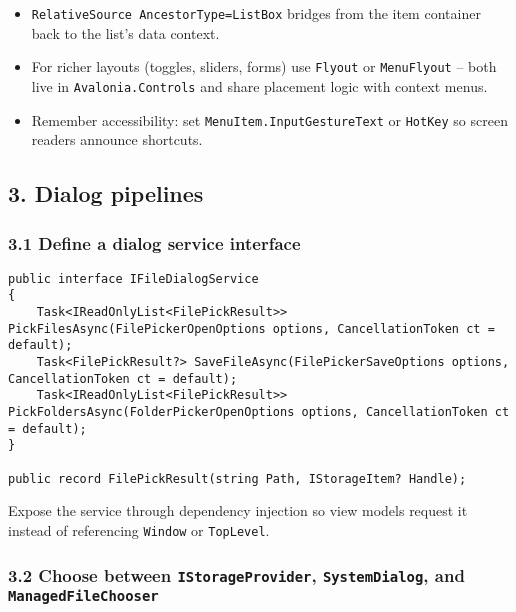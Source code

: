 \begin{itemize}
\tightlist
\item
  \passthrough{\lstinline!RelativeSource AncestorType=ListBox!} bridges
  from the item container back to the list's data context.
\item
  For richer layouts (toggles, sliders, forms) use
  \passthrough{\lstinline!Flyout!} or
  \passthrough{\lstinline!MenuFlyout!} -- both live in
  \passthrough{\lstinline!Avalonia.Controls!} and share placement logic
  with context menus.
\item
  Remember accessibility: set
  \passthrough{\lstinline!MenuItem.InputGestureText!} or
  \passthrough{\lstinline!HotKey!} so screen readers announce shortcuts.
\end{itemize}

\subsection{3. Dialog pipelines}\label{dialog-pipelines}

\subsubsection{3.1 Define a dialog service
interface}\label{define-a-dialog-service-interface}

\begin{lstlisting}
public interface IFileDialogService
{
    Task<IReadOnlyList<FilePickResult>> PickFilesAsync(FilePickerOpenOptions options, CancellationToken ct = default);
    Task<FilePickResult?> SaveFileAsync(FilePickerSaveOptions options, CancellationToken ct = default);
    Task<IReadOnlyList<FilePickResult>> PickFoldersAsync(FolderPickerOpenOptions options, CancellationToken ct = default);
}

public record FilePickResult(string Path, IStorageItem? Handle);
\end{lstlisting}

Expose the service through dependency injection so view models request
it instead of referencing \passthrough{\lstinline!Window!} or
\passthrough{\lstinline!TopLevel!}.

\subsubsection{\texorpdfstring{3.2 Choose between
\texttt{IStorageProvider}, \texttt{SystemDialog}, and
\texttt{ManagedFileChooser}}{3.2 Choose between IStorageProvider, SystemDialog, and ManagedFileChooser}}\label{choose-between-istorageprovider-systemdialog-and-managedfilechooser}

